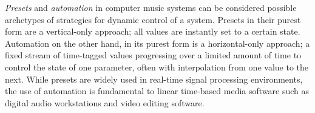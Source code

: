 \documentclass{article}
\begin{document}





\emph{Presets} and \emph{automation} in computer music systems can be considered possible archetypes of strategies for dynamic control of a system. Presets in their purest form are a vertical-only approach; all values are instantly set to a certain state. Automation on the other hand, in its purest form is a horizontal-only approach; a fixed stream of time-tagged values progressing over a limited amount of time to control the state of one parameter, often with interpolation from one value to the next. While presets are widely used in real-time signal processing environments, the use of automation is fundamental to linear time-based media software such as digital audio workstations and video editing software.
\end{document}
